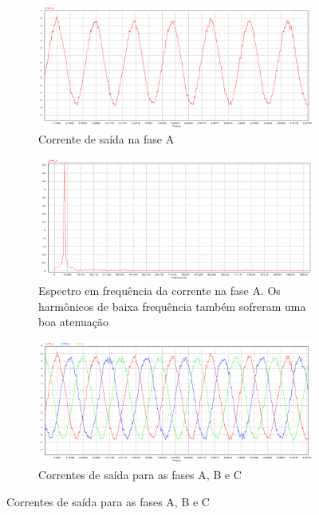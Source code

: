 \begin{figure}[!hbt]
	\centering
	\begin{subfigure}[b]{0.7\textwidth}
		\centering
		\includegraphics[width=\textwidth]{figuras/sim_figures/inversor_e_boost/corrente_ia.PNG}
		\caption{Corrente de saída na fase A}
    \end{subfigure}

    \begin{subfigure}[b]{0.7\textwidth}
		\centering
		\includegraphics[width=\textwidth]{figuras/sim_figures/inversor_e_boost/corrente_ia_espectro.PNG}
		\caption{Espectro em frequência da corrente na fase A. Os harmônicos de baixa frequência também sofreram uma boa atenuação}
    \end{subfigure}

	\begin{subfigure}[b]{0.7\textwidth}
		\includegraphics[width=\textwidth]{figuras/sim_figures/inversor_e_boost/corrente_ia_ib_ic.PNG}
		\caption{Correntes de saída para as fases A, B e C}
	\end{subfigure}


\end{figure}
